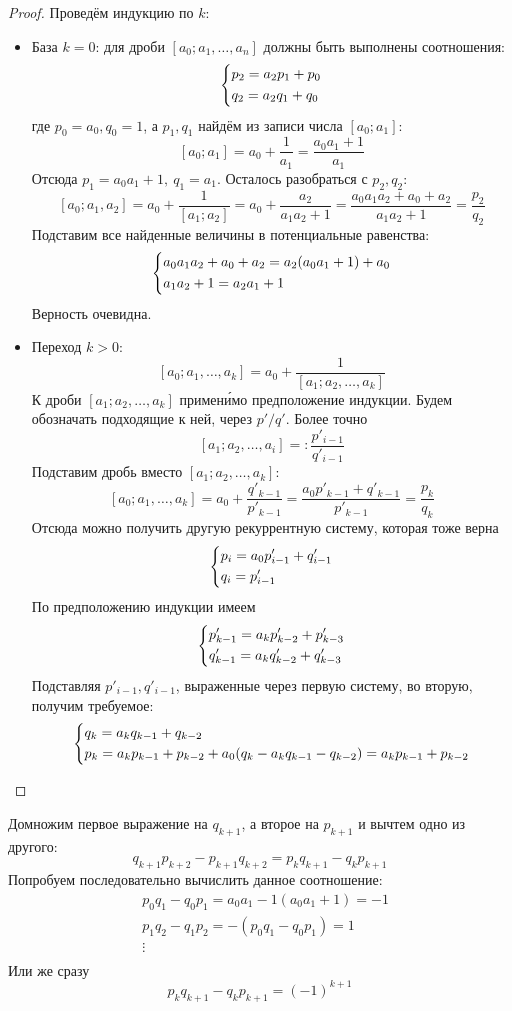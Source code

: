\begin{proof}
	Проведём индукцию по $k$:
	\begin{itemize}
		\item База $k = 0$: для дроби $[a_0; a_1, \ldots, a_n]$ должны быть выполнены соотношения:
		\[
			\left\{\begin{aligned}
				&{p_{2} = a_{2}p_{1} + p_0}
				\\
				&{q_{2} = a_{2}q_{1} + q_0}
			\end{aligned}\right.
		\]
		где $p_0 = a_0, q_0 = 1$, а $p_1, q_1$ найдём из записи числа $[a_0; a_1]$:
		\[
			[a_0; a_1] = a_0 + \frac{1}{a_1} = \frac{a_0 a_1 + 1}{a_1}
		\]
		Отсюда $p_1 = a_0 a_1 + 1,\ q_1 = a_1$. Осталось разобраться с $p_2, q_2$:
		\[
			[a_0; a_1, a_2] = a_0 + \frac{1}{[a_1; a_2]} = a_0 + \frac{a_2}{a_1 a_2 + 1} = \frac{a_0 a_1 a_2 + a_0 + a_2}{a_1 a_2 + 1} = \frac{p_2}{q_2}
		\]
		Подставим все найденные величины в потенциальные равенства:
		\[
			\left\{\begin{aligned}
				&{a_0 a_1 a_2 + a_0 + a_2 = a_2 (a_0 a_1 + 1) + a_0}
				\\
				&{a_1 a_2 + 1 = a_2 a_1 + 1}
			\end{aligned}\right.
		\]
		Верность очевидна.
		
		\item Переход $k > 0$:
		\[
			[a_0; a_1, \ldots, a_k] = a_0 + \frac{1}{[a_1; a_2, \ldots, a_k]}
		\]
		К дроби $[a_1; a_2, \ldots, a_k]$ примен\'{и}мо предположение индукции. Будем обозначать подходящие к ней, через $p'/q'$. Более точно
		\[
			[a_1; a_2, \ldots, a_i] =: \frac{p'_{i - 1}}{q'_{i - 1}}
		\]
		Подставим дробь вместо $[a_1; a_2, \ldots, a_k]$:
		\[
			[a_0; a_1, \ldots, a_k] = a_0 + \frac{q'_{k - 1}}{p'_{k - 1}} = \frac{a_0 p'_{k - 1} + q'_{k - 1}}{p'_{k - 1}} = \frac{p_k}{q_k}
		\]
		Отсюда можно получить другую рекуррентную систему, которая тоже верна
		\[
			\left\{\begin{aligned}
				&{p_i = a_0 p'_{i - 1} + q'_{i - 1}}
				\\
				&{q_i = p'_{i - 1}}
			\end{aligned}\right.
		\]
		По предположению индукции имеем
		\[
			\left\{\begin{aligned}
				&{p'_{k - 1} = a_k p'_{k - 2} + p'_{k - 3}}
				\\
				&{q'_{k - 1} = a_k q'_{k - 2} + q'_{k - 3}}
			\end{aligned}\right.
		\]
		Подставляя $p'_{i - 1}, q'_{i - 1}$, выраженные через первую систему, во вторую, получим требуемое:
		\[
			\left\{\begin{aligned}
				&{q_k = a_k q_{k - 1} + q_{k - 2}}
				\\
				&{p_k = a_k p_{k - 1} + p_{k - 2} + a_0(q_k - a_k q_{k - 1} - q_{k - 2}) = a_k p_{k - 1} + p_{k - 2}}
			\end{aligned}\right.
		\]
	\end{itemize}
\end{proof}

\begin{corollary}
	Домножим первое выражение на $q_{k + 1}$, а второе на $p_{k + 1}$ и вычтем одно из другого:
	\[
		q_{k + 1} p_{k + 2} - p_{k + 1} q_{k + 2} = p_k q_{k + 1} - q_k p_{k + 1}
	\]
	Попробуем последовательно вычислить данное соотношение:
	\begin{align*}
		&{p_0 q_1 - q_0 p_1 = a_0 a_1 - 1(a_0 a_1 + 1) = -1}
		\\
		&{p_1 q_2 - q_1 p_2 = -(p_0 q_1 - q_0 p_1) = 1}
		\\
		&{\vdots}
		\\
		&{}
	\end{align*}
	Или же сразу
	\[
		p_k q_{k + 1} - q_k p_{k + 1} = (-1)^{k + 1}
	\]
\end{corollary}

